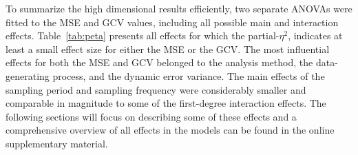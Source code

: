 \documentclass[man, floatsintext]{apa7}
\begin{document}
To summarize the high dimensional results efficiently, two separate ANOVAs were
fitted to the MSE and GCV values, including all possible main and interaction
effects. Table~\ref{tab:peta} presents all effects for which the
partial-$\eta^2$, indicates at least a small effect size for either the MSE or
the GCV\@. The most influential effects for both the MSE and GCV belonged to
the analysis method, the data-generating process, and the dynamic error
variance. The main effects of the sampling period and sampling frequency were
considerably smaller and comparable in magnitude to some of the first-degree
interaction effects. The following sections will focus
on describing some of these effects and a comprehensive overview of all effects
in the models can be found in the online supplementary material.

\begin{table}[tbp] %


\end{table}
\end{document}
